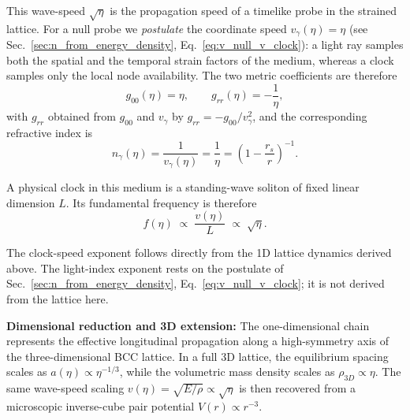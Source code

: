 \documentclass[10pt,a4paper]{article}
\begin{document}
This wave-speed $\sqrt{\eta}$ is the propagation speed of a timelike
probe in the strained lattice. For a null probe we \emph{postulate}
the coordinate speed $v_\gamma(\eta) = \eta$ (see
Sec.~\ref{sec:n_from_energy_density}, Eq.~\eqref{eq:v_null_v_clock}):
a light ray samples both the spatial and the temporal strain factors
of the medium, whereas a clock samples only the local node
availability. The two metric coefficients are therefore
\begin{equation}
	g_{00}(\eta) = \eta,
	\qquad
	g_{rr}(\eta) = -\frac{1}{\eta},
	\label{eq:g_coeffs_from_eta}
\end{equation}
with $g_{rr}$ obtained from $g_{00}$ and $v_\gamma$ by
$g_{rr} = -g_{00}/v_\gamma^2$, and the corresponding refractive index
is
\begin{equation}
	n_\gamma(\eta)
	=
	\frac{1}{v_\gamma(\eta)}
	=
	\frac{1}{\eta}
	=
	\left(1 - \frac{r_s}{r}\right)^{-1}.
	\label{eq:n_gamma_null}
\end{equation}
%
%

A physical clock in this medium is a standing-wave soliton of fixed
linear dimension \(L\). Its fundamental frequency is therefore
\begin{equation}
	f(\eta)
	\;\propto\;
	\frac{v(\eta)}{L}
	\;\propto\;
	\sqrt{\eta}
	.
\end{equation}

The clock-speed exponent follows directly from the 1D lattice
dynamics derived above. The light-index exponent rests on the
postulate of Sec.~\ref{sec:n_from_energy_density},
Eq.~\eqref{eq:v_null_v_clock}; it is not derived from the lattice
here.

\noindent

\textbf{Dimensional reduction and 3D extension:}
The one-dimensional chain represents the effective longitudinal
propagation along a high-symmetry axis of the three-dimensional BCC
lattice. In a full 3D lattice, the equilibrium spacing scales as
\(a(\eta) \propto \eta^{-1/3}\), while the volumetric mass density
scales as \(\rho_{3D} \propto \eta\). The same wave-speed scaling
\(v(\eta) = \sqrt{E/\rho} \propto \sqrt{\eta}\) is then recovered from
a microscopic inverse-cube pair potential
\(V(r) \propto r^{-3}\).
\end{document}
